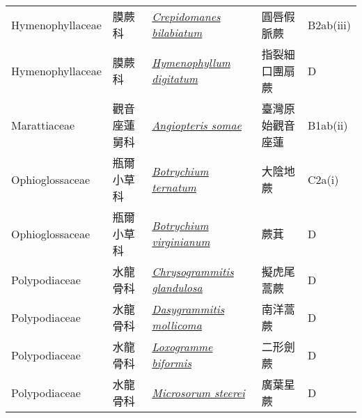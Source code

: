 {\begin{longtable}{L{2.5cm}L{2cm}L{5cm}L{2.5cm}L{3cm}}
    Hymenophyllaceae & 膜蕨科 & \href{http://www.theplantlist.org/tpl1.1/search?q=Crepidomanes+bilabiatum}{\textit{Crepidomanes bilabiatum} } & 圓唇假脈蕨 & B2ab(iii)    \\
    Hymenophyllaceae & 膜蕨科 & \href{http://www.theplantlist.org/tpl1.1/search?q=Hymenophyllum+digitatum}{\textit{Hymenophyllum digitatum} } & 指裂細口團扇蕨 & D    \\
    Marattiaceae & 觀音座蓮舅科 & \href{http://www.theplantlist.org/tpl1.1/search?q=Angiopteris+somae}{\textit{Angiopteris somae} } & 臺灣原始觀音座蓮 & B1ab(ii)    \\
    Ophioglossaceae & 瓶爾小草科 & \href{http://www.theplantlist.org/tpl1.1/search?q=Botrychium+ternatum}{\textit{Botrychium ternatum} } & 大陰地蕨 & C2a(i)    \\
    Ophioglossaceae & 瓶爾小草科 & \href{http://www.theplantlist.org/tpl1.1/search?q=Botrychium+virginianum}{\textit{Botrychium virginianum} } & 蕨萁 & D    \\
    Polypodiaceae & 水龍骨科 & \href{http://www.theplantlist.org/tpl1.1/search?q=Chrysogrammitis+glandulosa}{\textit{Chrysogrammitis glandulosa} } & 擬虎尾蒿蕨 & D    \\
    Polypodiaceae & 水龍骨科 & \href{http://www.theplantlist.org/tpl1.1/search?q=Dasygrammitis+mollicoma}{\textit{Dasygrammitis mollicoma} } & 南洋蒿蕨 & D    \\
    Polypodiaceae & 水龍骨科 & \href{http://www.theplantlist.org/tpl1.1/search?q=Loxogramme+biformis}{\textit{Loxogramme biformis} } & 二形劍蕨 & D    \\
    Polypodiaceae & 水龍骨科 & \href{http://www.theplantlist.org/tpl1.1/search?q=Microsorum+steerei}{\textit{Microsorum steerei} } & 廣葉星蕨 & D    \\

\end{longtable}}
